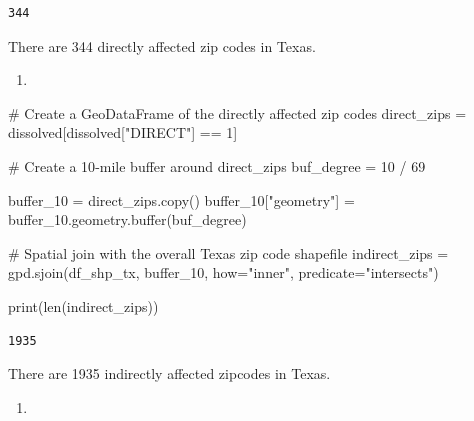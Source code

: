 \documentclass[
  letterpaper,
  DIV=11,
  numbers=noendperiod]{scrartcl}
\newenvironment{Shaded}{\begin{snugshade}}{\end{snugshade}}
\newcommand{\BuiltInTok}[1]{\textcolor[rgb]{0.00,0.23,0.31}{#1}}
\newcommand{\CommentTok}[1]{\textcolor[rgb]{0.37,0.37,0.37}{#1}}
\newcommand{\DecValTok}[1]{\textcolor[rgb]{0.68,0.00,0.00}{#1}}
\newcommand{\NormalTok}[1]{\textcolor[rgb]{0.00,0.23,0.31}{#1}}
\newcommand{\OperatorTok}[1]{\textcolor[rgb]{0.37,0.37,0.37}{#1}}
\newcommand{\StringTok}[1]{\textcolor[rgb]{0.13,0.47,0.30}{#1}}
\providecommand{\tightlist}{%
  \setlength{\itemsep}{0pt}\setlength{\parskip}{0pt}}\usepackage{longtable,booktabs,array}
\begin{document}
\begin{verbatim}
344
\end{verbatim}

There are 344 directly affected zip codes in Texas.

\begin{enumerate}
\def\labelenumi{\arabic{enumi}.}
\setcounter{enumi}{2}
\tightlist
\item
\end{enumerate}

\begin{Shaded}
\begin{Highlighting}[]
\CommentTok{\# Create a GeoDataFrame of the directly affected zip codes}
\NormalTok{direct\_zips }\OperatorTok{=}\NormalTok{ dissolved[dissolved[}\StringTok{"DIRECT"}\NormalTok{] }\OperatorTok{==} \DecValTok{1}\NormalTok{]}

\CommentTok{\# Create a 10{-}mile buffer around direct\_zips}
\NormalTok{buf\_degree }\OperatorTok{=} \DecValTok{10} \OperatorTok{/} \DecValTok{69}

\NormalTok{buffer\_10 }\OperatorTok{=}\NormalTok{ direct\_zips.copy()}
\NormalTok{buffer\_10[}\StringTok{"geometry"}\NormalTok{] }\OperatorTok{=}\NormalTok{ buffer\_10.geometry.}\BuiltInTok{buffer}\NormalTok{(buf\_degree)}

\CommentTok{\# Spatial join with the overall Texas zip code shapefile}
\NormalTok{indirect\_zips }\OperatorTok{=}\NormalTok{ gpd.sjoin(df\_shp\_tx, buffer\_10,}
\NormalTok{                          how}\OperatorTok{=}\StringTok{"inner"}\NormalTok{, predicate}\OperatorTok{=}\StringTok{"intersects"}\NormalTok{)}

\BuiltInTok{print}\NormalTok{(}\BuiltInTok{len}\NormalTok{(indirect\_zips))}
\end{Highlighting}
\end{Shaded}

\begin{verbatim}
1935
\end{verbatim}

There are 1935 indirectly affected zipcodes in Texas.

\begin{enumerate}
\def\labelenumi{\arabic{enumi}.}
\setcounter{enumi}{3}
\tightlist
\item
\end{enumerate}
\end{document}
